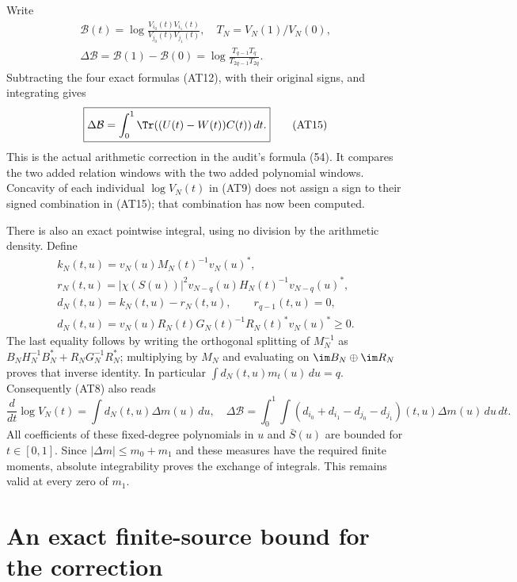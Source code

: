 \documentclass[10pt,a4paper,oneside]{report}
\begin{document}
Write
\[
 \begin{gathered}
 \mathcal B(t)=\log\frac{V_{i_0}(t)V_{i_1}(t)}{V_{j_0}(t)V_{j_1}(t)},
 \quad T_N=V_N(1)/V_N(0),\\
 \Delta\mathcal B=\mathcal B(1)-\mathcal B(0)
 =\log\frac{T_{q-1}T_q}{T_{2q-1}T_{2q}}.       \tag{AT14}
 \end{gathered}
\]
Subtracting the four exact formulas (AT12), with their original
signs, and integrating gives
\[
 \boxed{\displaystyle
 \Delta\mathcal B=\int_0^1\Tr((U(t)-W(t))C(t))\,dt .}
                                                        \tag{AT15}
\]
This is the actual arithmetic correction in the audit's formula
(54). It compares the two added relation windows with the two
added polynomial windows. Concavity of each individual
$\log V_N(t)$ in (AT9) does not assign a sign to their signed
combination in (AT15); that combination has now been computed.

There is also an exact pointwise integral, using no division by
the arithmetic density. Define
\[
 \begin{gathered}
 k_N(t,u)=v_N(u)M_N(t)^{-1}v_N(u)^*,\\
 r_N(t,u)=|\chi(S(u))|^2
 v_{N-q}(u)H_N(t)^{-1}v_{N-q}(u)^*,\\
 d_N(t,u)=k_N(t,u)-r_N(t,u),\qquad r_{q-1}(t,u)=0,\\
 d_N(t,u)=v_N(u)R_N(t)G_N(t)^{-1}R_N(t)^*v_N(u)^*\ge0.
                                                        \tag{AT16}
 \end{gathered}
\]
The last equality follows by writing the orthogonal splitting
of $M_N^{-1}$ as
$B_NH_N^{-1}B_N^*+R_NG_N^{-1}R_N^*$; multiplying by $M_N$
and evaluating on $\im B_N\oplus\im R_N$ proves that inverse
identity. In particular $\int d_N(t,u)m_t(u)\,du=q$.
Consequently (AT8) also reads
\[
 \frac{d}{dt}\log V_N(t)=\int d_N(t,u)\Delta m(u)\,du,
\quad
 \Delta\mathcal B=\int_0^1\int
 (d_{i_0}+d_{i_1}-d_{j_0}-d_{j_1})(t,u)\Delta m(u)\,du\,dt.
                                                        \tag{AT17}
\]
All coefficients of these fixed-degree polynomials in $u$ and
$\bar S(u)$ are bounded for $t\in[0,1]$. Since
$|\Delta m|\le m_0+m_1$ and these measures have the required
finite moments, absolute integrability proves the exchange of
integrals. This remains valid at every zero of $m_1$.

\section{An exact finite-source bound for the correction}
\end{document}
